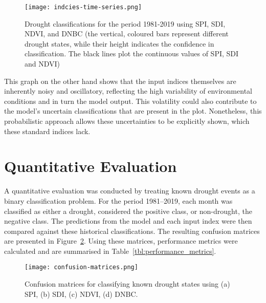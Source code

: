 \begin{figure}[!h]
    \centering
    \texttt{[image: indcies-time-series.png]}
    \caption[Indices \& Model Output Time Series]{Drought classifications for the period 1981-2019 using SPI, SDI, NDVI, and DNBC (the vertical, coloured bars represent different drought states, while their height indicates the confidence in classification. The black lines plot the continuous values of SPI, SDI and NDVI)}
    \label{fig:model-input-output}
\end{figure}

This graph on the other hand shows that the input indices themselves are inherently noisy and oscillatory, reflecting the high variability of environmental conditions and in turn the model output. This volatility could also contribute to the model's uncertain classifications that are present in the plot. Nonetheless, this probabilistic approach allows these uncertainties to be explicitly shown, which these standard indices lack.

\section{Quantitative Evaluation}

A quantitative evaluation was conducted by treating known drought events as a binary classification problem. For the period 1981–2019, each month was classified as either a drought, considered the positive class, or non-drought, the negative class. The predictions from the model and each input index were then compared against these historical classifications. The resulting confusion matrices are presented in Figure~\ref{fig:confusion-matrices}. Using these matrices, performance metrics were calculated and are summarised in Table~\ref{tbl:performance_metrics}.

\begin{figure}[!h]
    \centering
    \texttt{[image: confusion-matrices.png]}
    \caption[Confusion Matrices]{Confusion matrices for classifying known drought states using (a) SPI, (b) SDI, (c) NDVI, (d) DNBC.}
    \label{fig:confusion-matrices}
\end{figure}

